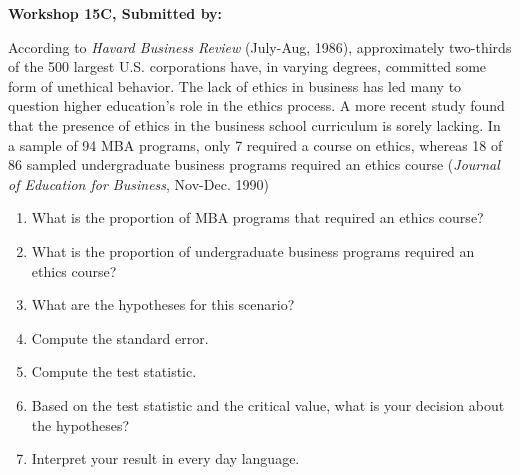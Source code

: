 \documentclass[11pt, chapterprefix=true]{scrbook}\usepackage[]{graphicx}\usepackage[]{color}
\begin{document}
\begin{exercises}
\begin{exercise}
\end{exercise}
\begin{solution}  %

\end{solution}

\clearpage

    \begin{exercise}  %

    \begin{center}
\begin{flushleft}\textbf{\large \hfill Workshop 15C, Submitted by: }\end{flushleft}

\end{center}

According to \textit{Havard Business Review} (July-Aug, 1986), approximately two-thirds of the 500 largest U.S. corporations have, in varying degrees, committed some form of unethical behavior. The lack of ethics in business has led many to question higher education’s role in the ethics process. A more recent study found that the presence of ethics in the business school curriculum is sorely lacking. In a sample of 94 MBA programs, only 7 required a course on ethics, whereas 18 of 86 sampled undergraduate business programs required an ethics course (\textit{Journal of Education for Business}, Nov-Dec. 1990)

\begin{enumerate}
\item  What is the proportion of MBA programs that required an ethics course?
\item  What is the proportion of undergraduate business programs required an ethics course?
\item  What are the hypotheses for this scenario?
\item  Compute the standard error.
\item  Compute the test statistic.
\item  Based on the test statistic and the critical value, what is your decision about the hypotheses?
\item  Interpret your result in every day language.
\end{enumerate}


\end{exercise}
\end{exercises}
\end{document}
